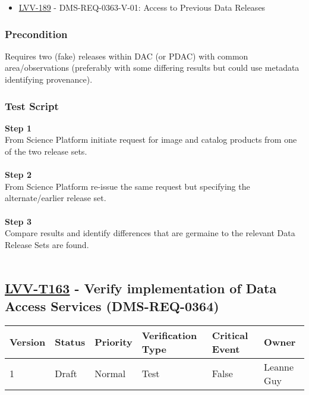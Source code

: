\begin{itemize}
\tightlist
\item
  \href{https://jira.lsstcorp.org/browse/LVV-189}{LVV-189} -
  DMS-REQ-0363-V-01: Access to Previous Data Releases
\end{itemize}

\hypertarget{precondition-18}{%
\subsubsection{Precondition}\label{precondition-18}}

Requires two (fake) releases within DAC (or PDAC) with common
area/observations (preferably with some differing results but could use
metadata identifying provenance).~

\hypertarget{test-script-139}{%
\subsubsection{Test Script}\label{test-script-139}}

\textbf{Step 1}\\
From Science Platform initiate request for image and catalog products
from one of the two release sets.\\
~\\
\textbf{Step 2}\\
From Science Platform re-issue the same request but specifying the
alternate/earlier release set.\\
~\\
\textbf{Step 3}\\
Compare results and identify differences that are germaine to the
relevant Data Release Sets are found.\\
~\\

\hypertarget{lvv-t163---verify-implementation-of-data-access-services-dms-req-0364}{%
\subsection{\texorpdfstring{\href{https://jira.lsstcorp.org/secure/Tests.jspa\#/testCase/LVV-T163}{LVV-T163}
- Verify implementation of Data Access Services
(DMS-REQ-0364)}{LVV-T163 - Verify implementation of Data Access Services (DMS-REQ-0364)}}\label{lvv-t163---verify-implementation-of-data-access-services-dms-req-0364}}

\begin{longtable}[]{@{}llllll@{}}
\toprule
Version & Status & Priority & Verification Type & Critical Event &
Owner\tabularnewline
\midrule
\endhead
1 & Draft & Normal & Test & False & Leanne Guy\tabularnewline
\bottomrule
\end{longtable}

